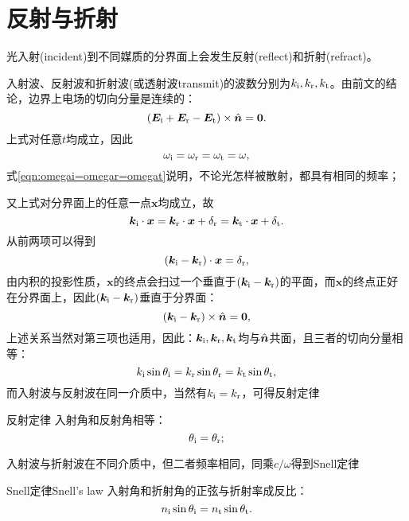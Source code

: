 \section{反射与折射}
光入射(incident)到不同媒质的分界面上会发生反射(reflect)和折射(refract)。
\begin{center}
\end{center}
入射波、反射波和折射波(或透射波transmit)的波数分别为$k_{\mathrm{i}},k_\text r,k_\text t$。由前文的结论，边界上电场的切向分量是连续的：
\[
    (\bm E_{\mathrm{i}}+\bm E_\text r-\bm E_\text t)\times\mathop{}\!\hat{\bm{n}}=\bm 0.
\]
上式对任意$t$均成立，因此
\begin{equation}
    \label{eqn:omegai=omegar=omegat}
    \omega_{\mathrm{i}}=\omega_\text r=\omega_\text t=\omega,
\end{equation}
式\eqref{eqn:omegai=omegar=omegat}说明，不论光怎样被散射，都具有相同的频率；

又上式对分界面上的任意一点$\bm x$均成立，故
\[
    \bm k_{\mathrm{i}}\cdot\bm x=\bm k_\text r\cdot\bm x+\delta_\text r=\bm k_\text t\cdot\bm x+\delta_\text t.
\]
从前两项可以得到
\[
    (\bm k_{\mathrm{i}}-\bm k_\text r)\cdot\bm x=\delta_\text r,
\]
由内积的投影性质，$\bm x$的终点会扫过一个垂直于$(\bm k_{\mathrm{i}}-\bm k_\text r)$的平面，而$\bm x$的终点正好在分界面上，因此$(\bm k_{\mathrm{i}}-\bm k_\text r)$垂直于分界面：
\[
    (\bm k_{\mathrm{i}}-\bm k_\text r)\times\mathop{}\!\hat{\bm{n}}=\bm 0,
\]
上述关系当然对第三项也适用，因此：$\bm k_{\mathrm{i}},\bm k_\text r,\bm k_\text t$均与$\mathop{}\!\hat{\bm{n}}$共面，且三者的切向分量相等：
\begin{equation}
    k_{\mathrm{i}}\sin\theta_{\mathrm{i}}=k_\text r\sin\theta_\text r=k_\text t\sin\theta_\text t,
\end{equation}
而入射波与反射波在同一介质中，当然有$k_{\mathrm{i}}=k_\text r$，可得反射定律
\begin{theorem}{反射定律}{}
    入射角和反射角相等：
    \begin{equation}
        \theta_{\mathrm{i}}=\theta_\text r;
    \end{equation}
\end{theorem}
入射波与折射波在不同介质中，但二者频率相同，同乘$c/\omega$得到Snell定律
\begin{theorem}{Snell定律}{Snell's law}
    入射角和折射角的正弦与折射率成反比：
    \begin{equation}
        \label{eqn:Snell}
        n_{\mathrm{i}}\sin\theta_{\mathrm{i}}=n_\text t\sin\theta_\text t.
    \end{equation}
\end{theorem}
